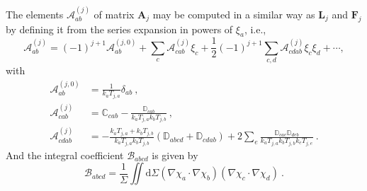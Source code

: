 \documentclass[a4paper]{jpconf}
\newcommand{\pow}[2]{#1^{(#2)}}
\newcommand{\dd}{\mathrm{d}}
\begin{document}
The elements $\pow{\mathcal{A}}{j}_{ab}$ of matrix $\mathbf{A}_j$ may be computed in a similar way as $\mathbf{L}_j$ and $\mathbf{F}_j$ by defining it from the series expansion in powers of $\xi_a$, i.e.,
\begin{equation}
\label{eq:app:Amatrix}
    \pow{\mathcal{A}}{j}_{ab}= (-1)^{j+1}\pow{\mathcal{A}}{j,0}_{ab}
    +\sum_{c}\pow{\mathcal{A}}{j}_{cab}\xi_c
    +\frac{1}{2}(-1)^{j+1}\sum_{c,d}\pow{\mathcal{A}}{j}_{cdab}\xi_c\xi_d+\cdots,
\end{equation}
with
\begin{subequations}
\label{eq:app:AmatrixCoeffs}
\begin{align}
    \pow{\mathcal{A}}{j,0}_{ab}&=\frac{1}{k_aT_{j,a}}\delta_{ab}~,\\
    \pow{\mathcal{A}}{j}_{cab}&=\mathbb{C}_{cab}-\frac{\mathbb{D}_{cab}}{k_aT_{j,a}k_bT_{j,b}}~,\\
    \pow{\mathcal{A}}{j}_{cdab}&=-\frac{k_aT_{j,a}+k_bT_{j,b}}{k_aT_{j,a}k_bT_{j,b}}\left(\mathbb{D}_{abcd}+\mathbb{D}_{cdab}\right)+
        2\sum_e \frac{\mathbb{D}_{cae}\mathbb{D}_{deb}}{k_aT_{j,a}k_bT_{j,b}k_eT_{j,e}}~.
\end{align}
\end{subequations}
And the integral coefficient $\mathcal{B}_{abcd}$ is given by
\begin{equation}
\label{eq:app:Bcoeff}
    \mathcal{B}_{abcd} = \frac{1}{\Sigma}\iint\dd \Sigma \left(\nabla\chi_a\cdot\nabla\chi_b\right)\left( \nabla\chi_c\cdot\nabla\chi_d\right)~.
\end{equation}
\end{document}
